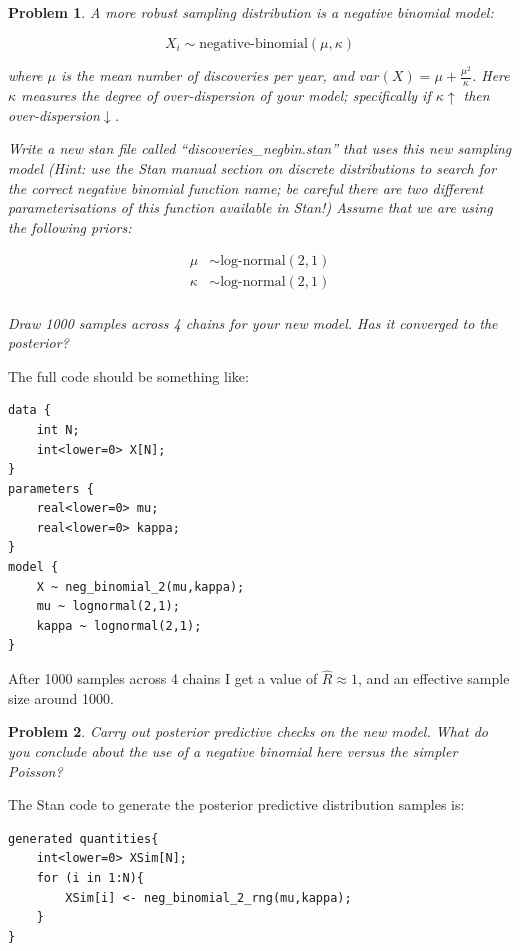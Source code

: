 \documentclass{article}
\newtheorem{problem}{Problem}[section]
\begin{document}
\begin{problem}
	A more robust sampling distribution is a negative binomial model:
	
	\begin{equation}
	X_i \sim \text{negative-binomial}(\mu,\kappa)
	\end{equation}
	
	where $\mu$ is the mean number of discoveries per year, and $var(X) = \mu + \frac{\mu^2}{\kappa}$. Here $\kappa$ measures the degree of over-dispersion of your model; specifically if $\kappa\uparrow$ then over-dispersion$\downarrow$.  
	
	Write a new stan file called ``discoveries\_negbin.stan'' that uses this new sampling model (Hint: use the Stan manual section on discrete distributions to search for the correct negative binomial function name; be careful there are two different parameterisations of this function available in Stan!) Assume that we are using the following priors:

\begin{align}
\mu&\sim \text{log-normal}(2,1)\\
\kappa&\sim \text{log-normal}(2,1)\\
\end{align}
	
	Draw 1000 samples across 4 chains for your new model. Has it converged to the posterior? 
\end{problem}

The full code should be something like:

\begin{verbatim}
data {
    int N;
    int<lower=0> X[N];
}
parameters {
    real<lower=0> mu;
    real<lower=0> kappa;
} 
model {
    X ~ neg_binomial_2(mu,kappa);
    mu ~ lognormal(2,1);
    kappa ~ lognormal(2,1);
}
\end{verbatim}	

After 1000 samples across 4 chains I get a value of $\hat{R}\approx 1$, and an effective sample size around 1000. 

\begin{problem}
	Carry out posterior predictive checks on the new model. What do you conclude about the use of a negative binomial here versus the simpler Poisson?
\end{problem}

The Stan code to generate the posterior predictive distribution samples is:

\begin{verbatim}
generated quantities{
    int<lower=0> XSim[N];
    for (i in 1:N){
        XSim[i] <- neg_binomial_2_rng(mu,kappa);
    }
}
\end{verbatim}
\end{document}

